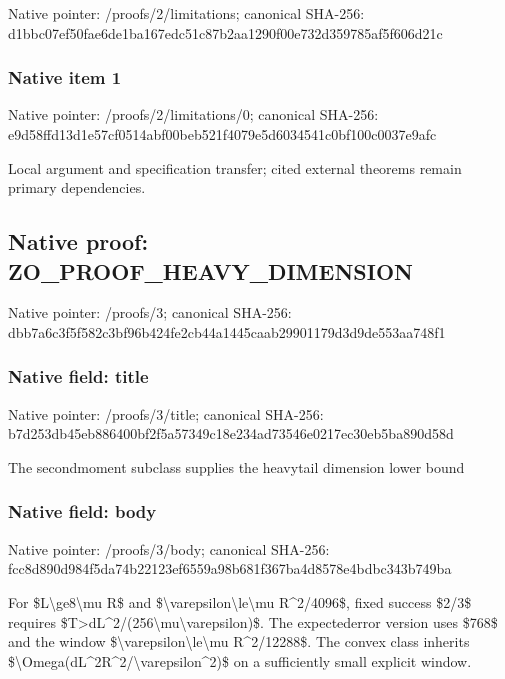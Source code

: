 \documentclass[10pt,a4paper]{article}
\begin{document}
Native pointer: /proofs/2/limitations; canonical SHA-256: d1bbc07ef50fae6de1ba167e\allowbreak{}dc51c87b2aa1290f00e732d3\allowbreak{}59785af5f606d21c



\subsubsection{Native item 1}


Native pointer: /proofs/2/limitations/0; canonical SHA-256: e9d58ffd13d1e57cf0514abf\allowbreak{}00beb521f4079e5d6034541c\allowbreak{}0bf100c0037e9afc


Local argument and specification transfer; cited external theorems remain primary dependencies.


\subsection{Native proof: ZO\_PROOF\_HEAVY\_DIMENSION}


Native pointer: /proofs/3; canonical SHA-256: dbb7a6c3f5f582c3bf96b424\allowbreak{}fe2cb44a1445caab29901179\allowbreak{}d3d9de553aa748f1



\subsubsection{Native field: title}


Native pointer: /proofs/3/title; canonical SHA-256: b7d253db45eb886400bf2f5a\allowbreak{}57349c18e234ad73546e0217\allowbreak{}ec30eb5ba890d58d


The secondmoment subclass supplies the heavytail dimension lower bound


\subsubsection{Native field: body}


Native pointer: /proofs/3/body; canonical SHA-256: fcc8d890d984f5da74b22123\allowbreak{}ef6559a98b681f367ba4d857\allowbreak{}8e4bdbc343b749ba


For \$L\textbackslash{}ge8\textbackslash{}mu R\$ and \$\textbackslash{}varepsilon\textbackslash{}le\textbackslash{}mu R\textasciicircum{}2/4096\$, fixed success \$2/3\$ requires \$T>dL\textasciicircum{}2/(256\textbackslash{}mu\textbackslash{}varepsilon)\$. The expectederror version uses \$768\$ and the window \$\textbackslash{}varepsilon\textbackslash{}le\textbackslash{}mu R\textasciicircum{}2/12288\$. The convex class inherits \$\textbackslash{}Omega(dL\textasciicircum{}2R\textasciicircum{}2/\textbackslash{}varepsilon\textasciicircum{}2)\$ on a sufficiently small explicit window.
\end{document}
